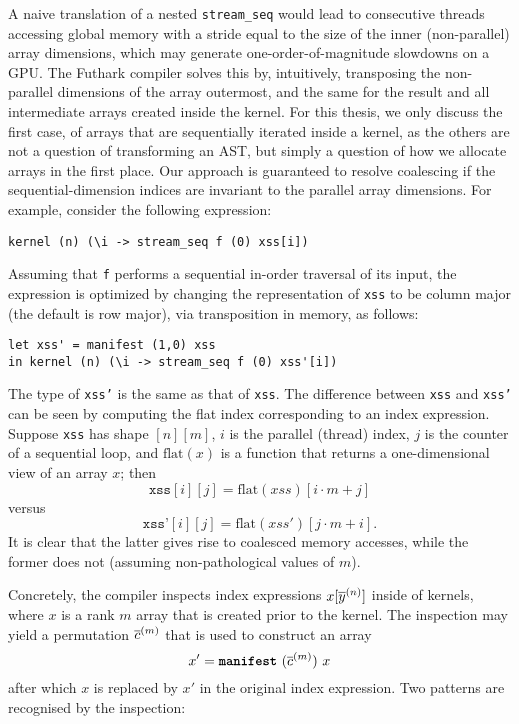 A naive translation of a nested \lstinline{stream_seq} would lead to
consecutive threads accessing global memory with a stride equal to the
size of the inner (non-parallel) array dimensions, which may generate
one-order-of-magnitude slowdowns on a GPU.
%
The Futhark compiler solves this by, intuitively, transposing the
non-parallel dimensions of the array outermost, and the same for the
result and all intermediate arrays created inside the kernel.  For
this thesis, we only discuss the first case, of arrays that are
sequentially iterated inside a kernel, as the others are not a
question of transforming an AST, but simply a question of how we
allocate arrays in the first place.  Our approach is guaranteed to
resolve coalescing if the sequential-dimension indices are invariant
to the parallel array dimensions. For example, consider the following
expression:
\begin{lstlisting}[xleftmargin=0.5cm,numbers=none]
kernel (n) (\i -> stream_seq f (0) xss[i])
\end{lstlisting}
Assuming that \lstinline{f} performs a sequential in-order traversal
of its input, the expression is optimized by changing the
representation of \texttt{xss} to be column major (the default is row
major), via transposition in memory, as follows:

\begin{lstlisting}[xleftmargin=0.5cm,numbers=none]
let xss' = manifest (1,0) xss
in kernel (n) (\i -> stream_seq f (0) xss'[i])
\end{lstlisting}

The type of \texttt{xss'} is the same as that of \texttt{xss}.  The
difference between \texttt{xss} and \texttt{xss'} can be seen by
computing the flat index corresponding to an index expression.
Suppose \texttt{xss} has shape $[n][m]$, $i$ is the parallel (thread)
index, $j$ is the counter of a sequential loop, and $\textrm{flat}(x)$
is a function that returns a one-dimensional view of an array $x$;
then
\[
  \texttt{xss}[i][j] = \textrm{flat}(xss)[i\cdot{}m+j]
\]
versus
\[
  \texttt{xss'}[i][j] = \textrm{flat}(xss')[j\cdot{}m+i].
\]
It is clear that the latter gives rise to coalesced memory accesses,
while the former does not (assuming non-pathological values of $m$).

Concretely, the compiler inspects index expressions $x[\overline{y}^{(n)}]$
inside of kernels, where $x$ is a rank $m$ array that is created prior
to the kernel.  The inspection may yield a permutation $\overline{c}^{(m)}$
that is used to construct an array
\[
  x' = \mbox{\texttt{\bfseries{manifest}}}~(\overline{c}^{(m)})~x
\]
after which $x$ is replaced by $x'$ in the original index expression.
Two patterns are recognised by the inspection:

